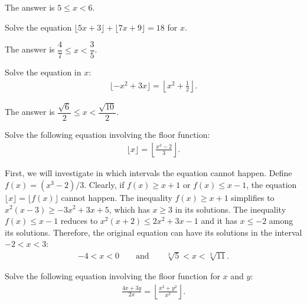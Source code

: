 \begin{solution}
    The answer is $5\leq x < 6$.
\end{solution}


\begin{question}
    Solve the equation $\lfloor 5x+3 \rfloor + \lfloor 7x+9 \rfloor = 18$ for $x$.
\end{question}

\begin{solution}
    The answer is $\dfrac{4}{7}\leq x < \dfrac{3}{5}$.
\end{solution}


\begin{question}
    Solve the equation in $x$:
    \begin{align*}
        \lfloor -x^2+3x \rfloor = \left\lfloor x^2+\frac{1}{2} \right\rfloor.
    \end{align*}
\end{question}

\begin{solution}
    The answer is $\dfrac{\sqrt{6}}{2}\leq x < \dfrac{\sqrt{10}}{2}$.
\end{solution}


\begin{question}
    Solve the following equation involving the floor function:
    \begin{align*}
        \lfloor x \rfloor = \left\lfloor \frac{x^3-2}{3}\right\rfloor.
    \end{align*}
\end{question}

\begin{solution}
    First, we will investigate in which intervals the equation cannot happen. Define $f(x)=(x^3-2)/3$. Clearly, if $f(x)\geq x+1$ or $f(x) \leq x-1$, the equation $\lfloor x \rfloor =  \lfloor f(x) \rfloor$ cannot happen. The inequality $f(x)\geq x+1$ simplifies to $x^2(x-3)\geq -3x^2+3x+5$, which has $x\geq 3$ in its solutions. The inequality $f(x) \leq x-1$ reduces to $x^2(x+2)\leq 2x^2+3x-1$ and it has $x\leq -2$ among its solutions. Therefore, the original equation can have its solutions in the interval $-2<x<3$:
    \begin{align*}
        -4< x< 0 \qquad \text{and} \qquad \sqrt[3]{5} < x < \sqrt[3]{11}.
    \end{align*}
\end{solution}

\begin{question}
    Solve the following equation involving the floor function for $x$ and $y$:
    \begin{align*}
        \frac{4x+3y}{2x} = \left\lfloor \frac{x^2+y^2}{x^2}\right\rfloor.
    \end{align*}
\end{question}

